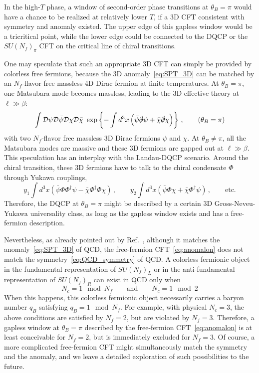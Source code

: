 \documentclass[
 reprint,







nofootinbib,


 amsmath,amssymb,
 aps,
 prd






tightenlines
]{revtex4-2}
\begin{document}
In the high-$T$ phase, a window of second-order phase transitions at $\theta_B=\pi$ would have a chance to be realized at relatively lower $T$, if a 3D CFT consistent with symmetry and anomaly existed.
The upper edge of this gapless window would be a tricritical point, while the lower edge could be connected to the DQCP or the $SU(N_f)_{\pi}$ CFT on the critical line of chiral transitions.

One may speculate that such an appropriate 3D CFT can simply be provided by colorless free fermions, because the 3D anomaly~\eqref{eq:SPT_3D} can be matched by an $N_f$-flavor free massless 4D Dirac fermion at finite temperatures.
At $\theta_B=\pi$, one Matsubara mode becomes massless, leading to the 3D effective theory at $\ell\gg\beta$:
\begin{align}\label{eq:anomalon}
    \int\mathcal{D}\psi\mathcal{D}\bar{\psi}\mathcal{D}\chi\mathcal{D}\bar{\chi}
    \ \exp\left\{-\int d^{3}x\, \Big(\bar{\psi}\slashed{\partial}\psi +\bar{\chi}\slashed{\partial}\chi\Big)\right\}\,,
    \qquad(\theta_B=\pi)
\end{align}
with two $N_f$-flavor free massless 3D Dirac fermions $\psi$ and $\chi$.
At $\theta_B\neq\pi$, all the Matsubara modes are massive and these 3D fermions are gapped out at $\ell\gg\beta$.
This speculation has an interplay with the Landau-DQCP scenario.
Around the chiral transition, these 3D fermions have to talk to the chiral condensate $\Phi$ through Yukawa couplings,
\begin{equation}
    y_1\int d^3x \left(\bar{\psi} \Phi \Phi^{\dag} \psi - \bar{\chi} \Phi^{\dag} \Phi \chi\right)\,,
    \qquad
    y_2\int d^3x \left(\bar{\psi}\Phi\chi + \bar{\chi}\Phi^{\dag}\psi \right)\,,
    \qquad\text{etc.}
\end{equation}
Therefore, the DQCP at $\theta_B=\pi$ might be described by a certain 3D Gross-Neveu-Yukawa universality class, as long as the gapless window exists and has a free-fermion description.

Nevertheless, as already pointed out by Ref.~\cite{Kobayashi:2023ajk}, although it matches the anomaly~\eqref{eq:SPT_3D} of QCD, the free-fermion CFT~\eqref{eq:anomalon} does not match the symmetry~\eqref{eq:QCD_symmetry} of QCD.
A colorless fermionic object in the fundamental representation of $SU(N_f)_L$ or in the anti-fundamental representation of $SU(N_f)_R$ can exist in QCD only when
\begin{equation}
    N_c = 1 \mod N_f
    \qquad\text{and}\qquad
    N_c = 1 \mod 2
\end{equation}
When this happens, this colorless fermionic object necessarily carries a baryon number $q_B$ satisfying $q_B = 1 \mod N_f$.
For example, with physical $N_c=3$, the above conditions are satisfied by $N_f=2$, but are violated by $N_f=3$.
Therefore, a gapless window at $\theta_B=\pi$ described by the free-fermion CFT~\eqref{eq:anomalon} is at least conceivable for $N_f=2$, but is immediately excluded for $N_f=3$.
Of course, a more complicated free-fermion CFT might simultaneously match the symmetry and the anomaly, and we leave a detailed exploration of such possibilities to the future.
\end{document}
